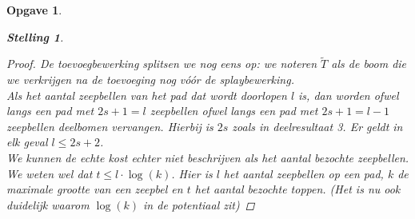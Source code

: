 \documentclass[12pt,hidelinks]{article}
\newtheorem{opgave}{Opgave}
\newtheorem{stelling}{Stelling}
\newcommand{\newln}{~\\\vspace{0.5em}}
\begin{document}
\begin{opgave}
\begin{description}
\begin{stelling}
\begin{proof}
                        De toevoegbewerking splitsen we nog eens op: we noteren $\tilde{T}$ als de boom die we verkrijgen na de toevoeging nog vóór de splaybewerking.
                        \newln
                        Als het aantal zeepbellen van het pad dat wordt doorlopen $l$ is, dan worden ofwel langs een pad met $2s+1 = l$ zeepbellen ofwel langs een pad met $2s+1=l-1$ zeepbellen deelbomen vervangen. Hierbij is $2s$ zoals in deelresultaat 3. Er geldt in elk geval $l \le 2s + 2$.
                        \newln
                        We kunnen de echte kost echter niet beschrijven als het aantal bezochte zeepbellen. 
                        We weten wel dat $t \le l\cdot\log(k)$.
                        Hier is $l$ het aantal zeepbellen op een pad, $k$ de maximale grootte van een zeepbel en $t$ het aantal bezochte toppen. 
                        (Het is nu ook duidelijk waarom $\log(k)$ in de potentiaal zit)



\end{proof}
\end{stelling}
\end{description}
\end{opgave}
\end{document}
